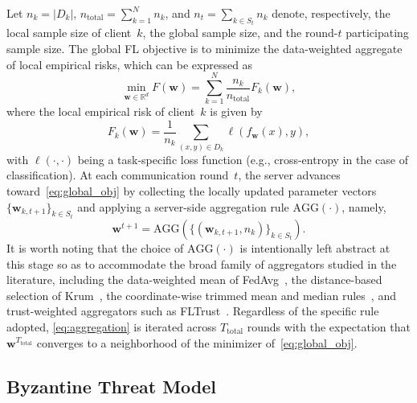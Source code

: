 \documentclass[journal]{IEEEtran}
\begin{document}
Let $n_k = |D_k|$, $n_{\text{total}} = \sum_{k=1}^{N} n_k$, and $n_t = \sum_{k \in S_t} n_k$ denote, respectively, the local sample size of client~$k$, the global sample size, and the round-$t$ participating sample size. The global FL objective is to minimize the data-weighted aggregate of local empirical risks, which can be expressed as
\begin{equation}
\min_{\mathbf{w} \in \mathbb{R}^d} F(\mathbf{w}) = \sum_{k=1}^{N} \frac{n_k}{n_{\text{total}}} F_k(\mathbf{w}),
\label{eq:global_obj}
\end{equation}
where the local empirical risk of client~$k$ is given by
\begin{equation}
F_k(\mathbf{w}) = \frac{1}{n_k} \sum_{(x,y) \in D_k} \ell(f_{\mathbf{w}}(x), y),
\label{eq:local_risk}
\end{equation}
with $\ell(\cdot, \cdot)$ being a task-specific loss function (e.g., cross-entropy in the case of classification). At each communication round~$t$, the server advances toward~\eqref{eq:global_obj} by collecting the locally updated parameter vectors $\{\mathbf{w}_{k,t+1}\}_{k \in S_t}$ and applying a server-side aggregation rule $\text{AGG}(\cdot)$, namely,
\begin{equation}
\mathbf{w}^{t+1} = \text{AGG}\left(\{(\mathbf{w}_{k,t+1}, n_k)\}_{k \in S_t}\right).
\label{eq:aggregation}
\end{equation}
It is worth noting that the choice of $\text{AGG}(\cdot)$ is intentionally left abstract at this stage so as to accommodate the broad family of aggregators studied in the literature, including the data-weighted mean of FedAvg~\cite{mcmahan2017communication}, the distance-based selection of Krum~\cite{blanchard2017machine}, the coordinate-wise trimmed mean and median rules~\cite{yin2018byzantine}, and trust-weighted aggregators such as FLTrust~\cite{cao2020fltrust}. Regardless of the specific rule adopted, \eqref{eq:aggregation} is iterated across $T_{\text{total}}$ rounds with the expectation that $\mathbf{w}^{T_{\text{total}}}$ converges to a neighborhood of the minimizer of~\eqref{eq:global_obj}.

\subsection{Byzantine Threat Model}
\end{document}

